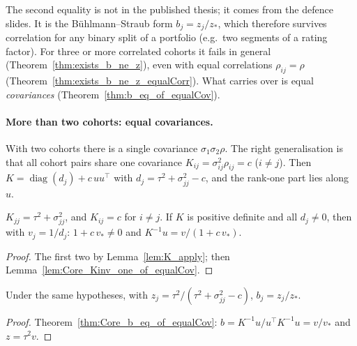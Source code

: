 \begin{remark}\label{rem:b1_eq_z}
  The second equality is not in the published thesis; it comes from the
  defence slides. It is the Bühlmann--Straub form $b_j = z_j/z_*$, which
  therefore survives correlation for any binary split of a portfolio
  (e.g.\ two segments of a rating factor). For three or more correlated
  cohorts it fails in general (Theorem~\ref{thm:exists_b_ne_z}), even with
  equal correlations $\rho_{ij} = \rho$ (Theorem~\ref{thm:exists_b_ne_z_equalCorr}).
  What carries over is equal \emph{covariances}
  (Theorem~\ref{thm:b_eq_of_equalCov}).
\end{remark}

\paragraph{More than two cohorts: equal covariances.}
With two cohorts there is a single covariance $\sigma_1\sigma_2\rho$. The
right generalisation is that all cohort pairs share one covariance
$K_{ij} = \sigma_{ij}^2\rho_{ij} = c$ ($i \ne j$). Then
$K = \operatorname{diag}(d_j) + c\,uu^\top$ with
$d_j = \tau^2 + \sigma_{jj}^2 - c$, and the rank-one part lies along $u$.

\begin{lemma}\label{lem:Kinv_one_of_equalCov}
  \leanok
  $K_{jj} = \tau^2 + \sigma^2_{jj}$, and $K_{ij} = c$ for $i \ne j$. If $K$ is
  positive definite and all $d_j \ne 0$, then with $v_j = 1/d_j$:
  $1 + c\,v_* \ne 0$ and $K^{-1}u = v/(1 + c\,v_*)$.
\end{lemma}
\begin{proof}
  \leanok
  The first two by Lemma~\ref{lem:K_apply}; then
  Lemma~\ref{lem:Core_Kinv_one_of_equalCov}.
\end{proof}

\begin{theorem}\label{thm:b_eq_of_equalCov}
  \leanok
  Under the same hypotheses, with $z_j = \tau^2/(\tau^2 + \sigma_{jj}^2 - c)$,
  $b_j = z_j/z_*$.
\end{theorem}
\begin{proof}
  \leanok
  Theorem~\ref{thm:Core_b_eq_of_equalCov}: $b = K^{-1}u/u^\top K^{-1}u = v/v_*$
  and $z = \tau^2 v$.
\end{proof}

